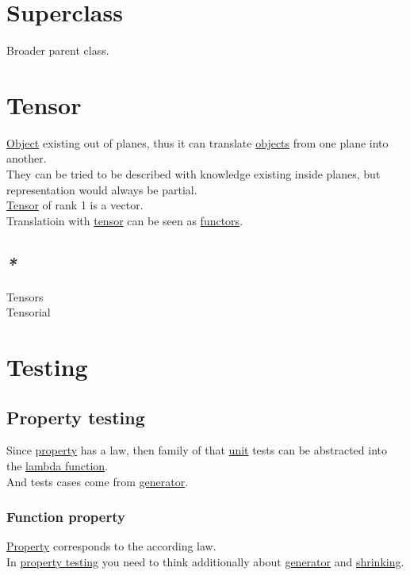 \documentclass[a4paper,14pt,oneside]{book}
\begin{document}
\chapter{\label{orge4ed703}Superclass}
\label{sec:org2287d83}
Broader parent class.\\

\chapter{\label{org5ebe6c7}Tensor}
\label{sec:org5ff3418}
\hyperref[orgef6fa9d]{Object} existing out of planes, thus it can translate \hyperref[orgd42a7f2]{objects} from one plane into another.\\
They can be tried to be described with knowledge existing inside planes, but representation would always be partial.\\
\hyperref[org5ebe6c7]{Tensor} of rank 1 is a vector.\\

Translatioin with \hyperref[org5ebe6c7]{tensor} can be seen as \hyperref[org7f51692]{functors}.\\

\section{\emph{*}}
\label{sec:org0262f2e}

\label{org8ce3212}Tensors\\
\label{org7d28093}Tensorial\\

\chapter{\label{org9de3ef8}Testing}
\label{sec:org80bad27}
\section{\label{org7d55d93}Property testing}
\label{sec:orgde43c6d}
Since \hyperref[orgc713167]{property} has a law, then family of that \hyperref[orga4edbd5]{unit} tests can be abstracted into the \hyperref[orgdb73cc8]{lambda function}.\\
And tests cases come from \hyperref[orgd344dcd]{generator}.\\

\subsection{\label{org7ecd8a4}Function property}
\label{sec:org1ddfffe}
\hyperref[orgc713167]{Property} corresponds to the according law.\\
In \hyperref[org7d55d93]{property testing} you need to think additionally about \hyperref[orgd344dcd]{generator} and \hyperref[orgba88c1c]{shrinking}.\\
\end{document}
